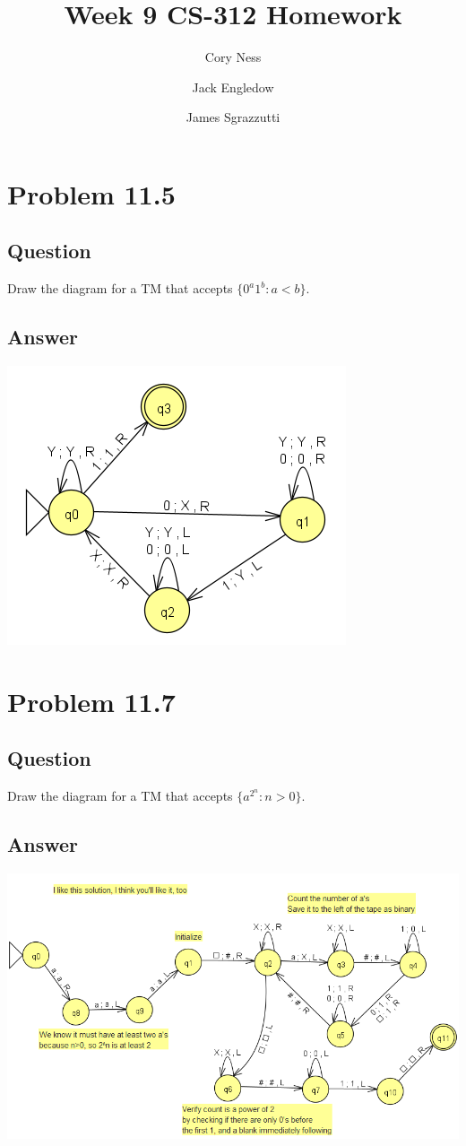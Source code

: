\documentclass[12pt, a4paper]{article}
\title{Week 9 CS-312 Homework}
\author{
	Cory Ness
	\and
	Jack Engledow
	\and
	James Sgrazzutti
}
\begin{document}
\maketitle

\section{Problem 11.5}
\subsection{Question}
Draw the diagram for a TM that accepts $\{0^{a}1^{b}: a < b\}$.
\subsection{Answer}
\begin{center}
\includegraphics[scale=1]{11.5}
\end{center}

\section{Problem 11.7}
\subsection{Question}
Draw the diagram for a TM that accepts $\{a^{2^{n}}: n > 0\}$.
\subsection{Answer}
\begin{center}
\includegraphics[scale=0.8]{11.7}
\end{center}
\end{document}
